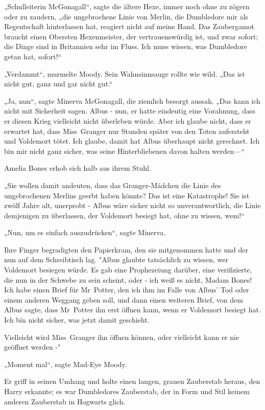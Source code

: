 {„Schulleiterin McGonagall“, sagte die ältere Hexe, immer noch ohne zu zögern oder zu zaudern, „die ungebrochene Linie von Merlin, die Dumbledore mir als Regentschaft hinterlassen hat, reagiert nicht auf meine Hand. Das Zaubergamot braucht einen Obersten Hexenmeister, der vertrauenswürdig ist, und zwar sofort; die Dinge sind in Britannien sehr im Fluss. Ich muss wissen, was Dumbledore getan hat, sofort!“

„Verdammt“, murmelte Moody. Sein Wahnsinnsauge rollte wie wild. „Das ist nicht gut, ganz und gar nicht gut.“

„Ja, nun“, sagte Minerva McGonagall, die ziemlich besorgt aussah. „Das kann ich nicht mit Sicherheit sagen. Albus - nun, er hatte eindeutig eine Vorahnung, dass er diesen Krieg vielleicht nicht überleben würde. Aber ich glaube nicht, dass er erwartet hat, dass Miss~Granger nur Stunden später von den Toten aufersteht und Voldemort tötet. Ich glaube, damit hat Albus überhaupt nicht gerechnet. Ich bin mir nicht ganz sicher, was seine Hinterbliebenen davon halten werden—“

Amelia Bones erhob sich halb aus ihrem Stuhl.

„Sie wollen damit andeuten, dass das Granger-Mädchen die Linie des ungebrochenen Merlins geerbt haben könnte? Das ist eine Katastrophe! Sie ist zwölf Jahre alt, unerprobt - Albus wäre sicher nicht so unverantwortlich, die Linie demjenigen zu überlassen, der Voldemort besiegt hat, ohne zu wissen, wem!“

„Nun, um es einfach auszudrücken“, sagte Minerva.

Ihre Finger begradigten den Papierkram, den sie mitgenommen hatte und der nun auf dem Schreibtisch lag. "Albus glaubte tatsächlich zu wissen, wer Voldemort besiegen würde. Es gab eine Prophezeiung darüber, eine verifizierte, die nun in der Schwebe zu sein scheint, oder - ich weiß es nicht, Madam Bones! Ich habe einen Brief für Mr~Potter, den ich ihm im Falle von Albus' Tod oder einem anderen Weggang geben soll, und dann einen weiteren Brief, von dem Albus sagte, dass Mr~Potter ihn erst öffnen kann, wenn er Voldemort besiegt hat. Ich bin nicht sicher, was jetzt damit geschieht.

Vielleicht wird Miss~Granger ihn öffnen können, oder vielleicht kann er nie geöffnet werden -"

„Moment mal“, sagte Mad-Eye Moody.

Er griff in seinen Umhang und holte einen langen, grauen Zauberstab heraus, den Harry erkannte; es war Dumbledores Zauberstab, der in Form und Stil keinem anderen Zauberstab in Hogwarts glich.

}
